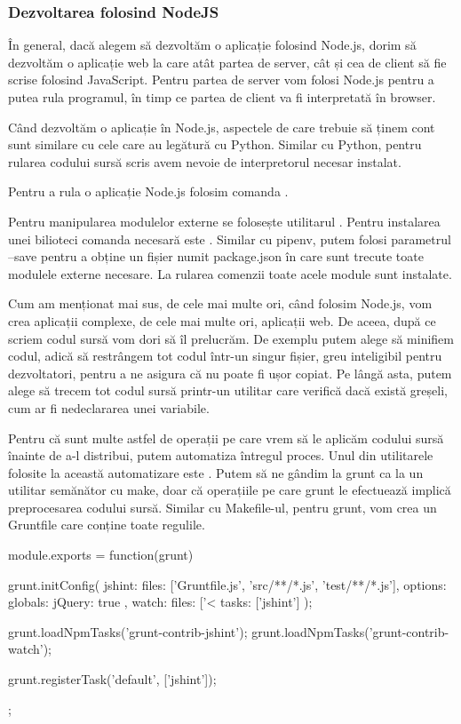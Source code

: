 \subsubsection{Dezvoltarea folosind NodeJS}
\label{sec:appdev-ideinstall-js-dev}

În general, dacă alegem să dezvoltăm o aplicație folosind Node.js, dorim să
dezvoltăm o aplicație web la care atât partea de server, cât și cea de client să
fie scrise folosind JavaScript. Pentru partea de server vom folosi Node.js
pentru a putea rula programul, în timp ce partea de client va fi interpretată în
browser.

Când dezvoltăm o aplicație în Node.js, aspectele de care trebuie să ținem cont
sunt similare cu cele care au legătură cu Python. Similar cu Python, pentru
rularea codului sursă scris avem nevoie de interpretorul necesar instalat.

Pentru a rula o aplicație Node.js folosim comanda .

Pentru manipularea modulelor externe se folosește utilitarul . Pentru
instalarea unei bilioteci comanda necesară este .
Similar cu pipenv, putem folosi parametrul --save pentru a obține un fișier
numit package.json în care sunt trecute toate modulele externe necesare. La
rularea comenzii  toate acele module sunt instalate.

Cum am menționat mai sus, de cele mai multe ori, când folosim Node.js, vom crea
aplicații complexe, de cele mai multe ori, aplicații web. De aceea, după ce
scriem codul sursă vom dori să îl prelucrăm. De exemplu putem alege să minifiem
codul, adică să restrângem tot codul într-un singur fișier, greu inteligibil
pentru dezvoltatori, pentru a ne asigura că nu poate fi ușor copiat. Pe lângă
asta, putem alege să trecem tot codul sursă printr-un utilitar care verifică
dacă există greșeli, cum ar fi nedeclararea unei variabile.

Pentru că sunt multe astfel de operații pe care vrem să le aplicăm codului sursă
înainte de a-l distribui, putem automatiza întregul proces. Unul din utilitarele
folosite la această automatizare este . Putem să ne gândim la grunt
ca la un utilitar semănător cu make, doar că operațiile pe care grunt le
efectuează implică preprocesarea codului sursă. Similar cu Makefile-ul, pentru
grunt, vom crea un Gruntfile care conține toate regulile.

\begin{screen}
module.exports = function(grunt) {

 grunt.initConfig({
   jshint: {
     files: ['Gruntfile.js', 'src/**/*.js', 'test/**/*.js'],
     options: {
       globals: {
         jQuery: true
       }
     }
   },
   watch: {
     files: ['<%
     tasks: ['jshint']
   }
 });

 grunt.loadNpmTasks('grunt-contrib-jshint');
 grunt.loadNpmTasks('grunt-contrib-watch');

 grunt.registerTask('default', ['jshint']);

};
\end{screen}


